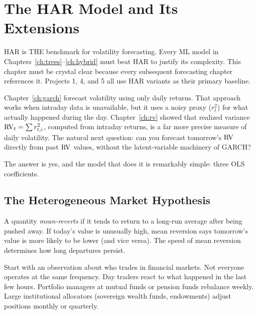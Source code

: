 \chapter{The HAR Model and Its Extensions}
\label{ch:har}

\begin{application}
HAR is THE benchmark for volatility forecasting.
Every ML model in Chapters~\ref{ch:trees}--\ref{ch:hybrid} must beat HAR to justify its complexity.
This chapter must be crystal clear because every subsequent forecasting chapter references it.
Projects 1, 4, and 5 all use HAR variants as their primary baseline.
\end{application}

Chapter~\ref{ch:garch} forecast volatility using only daily returns.
That approach works when intraday data is unavailable, but it uses a noisy proxy ($r^2_t$) for what actually happened during the day.
Chapter~\ref{ch:rv} showed that realized variance $\operatorname{RV}_t = \sum r^2_{t,i}$, computed from intraday returns, is a far more precise measure of daily volatility.
The natural next question: can you forecast tomorrow's $\operatorname{RV}$ directly from past $\operatorname{RV}$ values, without the latent-variable machinery of GARCH?

The answer is yes, and the model that does it is remarkably simple: three OLS coefficients.


\section{The Heterogeneous Market Hypothesis}
\label{sec:hmh}

\begin{prereq}
A quantity \emph{mean-reverts} if it tends to return to a long-run average after being pushed away.
If today's value is unusually high, mean reversion says tomorrow's value is more likely to be lower (and vice versa).
The speed of mean reversion determines how long departures persist.
\end{prereq}

Start with an observation about who trades in financial markets.
Not everyone operates at the same frequency.
Day traders react to what happened in the last few hours.
Portfolio managers at mutual funds or pension funds rebalance weekly.
Large institutional allocators (sovereign wealth funds, endowments) adjust positions monthly or quarterly.

